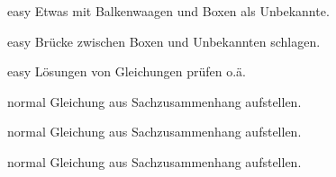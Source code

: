 \documentclass[../lineare_gleichungen.tex]{subfiles}
\begin{document}
    \begin{exercise}{easy}
        Etwas mit Balkenwaagen und Boxen als Unbekannte.
    \end{exercise}
    \begin{exercise}{easy}
        Brücke zwischen Boxen und Unbekannten schlagen.
    \end{exercise}
    \begin{exercise}{easy}
        Lösungen von Gleichungen prüfen o.ä.
    \end{exercise}
    \begin{exercise}{normal}
        Gleichung aus Sachzusammenhang aufstellen.
    \end{exercise}
    \begin{exercise}{normal}
        Gleichung aus Sachzusammenhang aufstellen.
    \end{exercise}
    \begin{exercise}{normal}
        Gleichung aus Sachzusammenhang aufstellen.
    \end{exercise}
\end{document}
